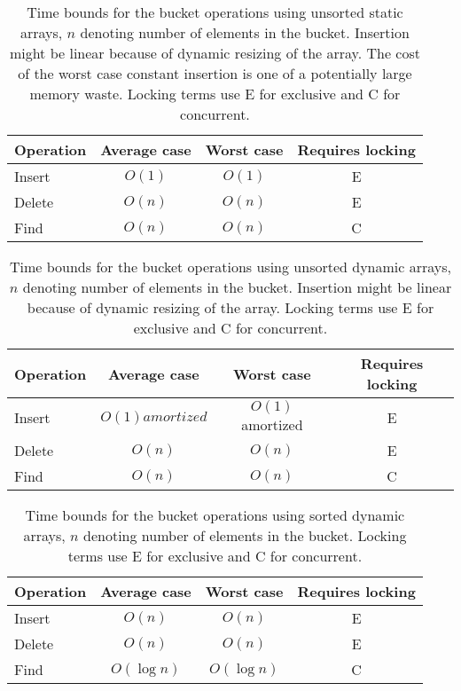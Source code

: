 \begin{table}[h!]
    \centering
    \begin{tabular}[here]{ l || c | c | c}
        Operation & Average case & Worst case & Requires locking  \\ \hline
        Insert    & $O(1)$ & $O(1)$ & E \\ \hline
        Delete    & $O(n)$ & $O(n)$ & E \\ \hline
        Find      & $O(n)$ & $O(n)$ & C  \\ \hline
    \end{tabular}
    \caption{Time bounds for the bucket operations using unsorted static
    arrays, $n$ denoting number of elements in the bucket. Insertion might be
    linear because of dynamic resizing of the array. The cost of the worst case
    constant insertion is one of a potentially large memory waste. Locking
    terms use E for exclusive and C for concurrent.}
    \label{tab:bounds:unsortedarray}
\end{table}
\begin{table}[h!]
    \centering
    \begin{tabular}[here]{ l || c | c | c}
        Operation & Average case & Worst case & Requires locking  \\ \hline
        Insert    & $O(1) amortized$ & $O(1)$ amortized & E \\ \hline
        Delete    & $O(n)$ & $O(n)$ & E \\ \hline
        Find      & $O(n)$ & $O(n)$ & C  \\ \hline
    \end{tabular}
    \caption{Time bounds for the bucket operations using unsorted dynamic
    arrays, $n$ denoting number of elements in the bucket. Insertion might be
    linear because of dynamic resizing of the array. Locking terms use E for
        exclusive and C for concurrent.}
    \label{tab:bounds:unsorteddynarray}
\end{table}
\begin{table}[h!]
    \centering
    \begin{tabular}[here]{ l || c | c | c}
        Operation & Average case & Worst case & Requires locking  \\ \hline
        Insert    & $O(n)$  & $O(n)$           & E \\ \hline
        Delete    & $O(n)$  & $O(n)$           & E \\ \hline
        Find      & $O(\log n)$ & $O(\log n)$ & C  \\ \hline
    \end{tabular}
    \caption{Time bounds for the bucket operations using sorted dynamic arrays,
    $n$ denoting number of elements in the bucket. Locking terms use E for
        exclusive and C for concurrent.}
    \label{tab:bounds:sortedarray}
\end{table}


